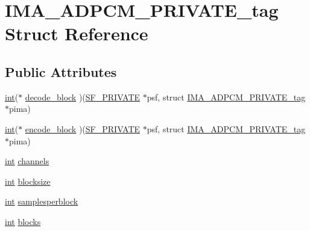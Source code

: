 \hypertarget{struct_i_m_a___a_d_p_c_m___p_r_i_v_a_t_e__tag}{}\section{I\+M\+A\+\_\+\+A\+D\+P\+C\+M\+\_\+\+P\+R\+I\+V\+A\+T\+E\+\_\+tag Struct Reference}
\label{struct_i_m_a___a_d_p_c_m___p_r_i_v_a_t_e__tag}
\subsection*{Public Attributes}
\begin{DoxyCompactItemize}
\item 
\hyperlink{xmltok_8h_a5a0d4a5641ce434f1d23533f2b2e6653}{int}($\ast$ \hyperlink{struct_i_m_a___a_d_p_c_m___p_r_i_v_a_t_e__tag_a7ac43cfa3dce06bc6d6a89ddf80eac72}{decode\+\_\+block} )(\hyperlink{libsndfile_2src_2common_8h_ab5debd339ecaf40f50a223e218900c24}{S\+F\+\_\+\+P\+R\+I\+V\+A\+TE} $\ast$psf, struct \hyperlink{struct_i_m_a___a_d_p_c_m___p_r_i_v_a_t_e__tag}{I\+M\+A\+\_\+\+A\+D\+P\+C\+M\+\_\+\+P\+R\+I\+V\+A\+T\+E\+\_\+tag} $\ast$pima)
\item 
\hyperlink{xmltok_8h_a5a0d4a5641ce434f1d23533f2b2e6653}{int}($\ast$ \hyperlink{struct_i_m_a___a_d_p_c_m___p_r_i_v_a_t_e__tag_a158c7ecc3fb4492e97cd1d25066cad70}{encode\+\_\+block} )(\hyperlink{libsndfile_2src_2common_8h_ab5debd339ecaf40f50a223e218900c24}{S\+F\+\_\+\+P\+R\+I\+V\+A\+TE} $\ast$psf, struct \hyperlink{struct_i_m_a___a_d_p_c_m___p_r_i_v_a_t_e__tag}{I\+M\+A\+\_\+\+A\+D\+P\+C\+M\+\_\+\+P\+R\+I\+V\+A\+T\+E\+\_\+tag} $\ast$pima)
\item 
\hyperlink{xmltok_8h_a5a0d4a5641ce434f1d23533f2b2e6653}{int} \hyperlink{struct_i_m_a___a_d_p_c_m___p_r_i_v_a_t_e__tag_aecef5173edb8ab1d159d006534a1fd1a}{channels}
\item 
\hyperlink{xmltok_8h_a5a0d4a5641ce434f1d23533f2b2e6653}{int} \hyperlink{struct_i_m_a___a_d_p_c_m___p_r_i_v_a_t_e__tag_a0f049bcb950ec99185775c022762459c}{blocksize}
\item 
\hyperlink{xmltok_8h_a5a0d4a5641ce434f1d23533f2b2e6653}{int} \hyperlink{struct_i_m_a___a_d_p_c_m___p_r_i_v_a_t_e__tag_a14c3f41d47a4cf47616649ab2187dae1}{samplesperblock}
\item 
\hyperlink{xmltok_8h_a5a0d4a5641ce434f1d23533f2b2e6653}{int} \hyperlink{struct_i_m_a___a_d_p_c_m___p_r_i_v_a_t_e__tag_ab552c82cd7a551d4d106ef01680c0065}{blocks}
\item 

\end{DoxyCompactItemize}
